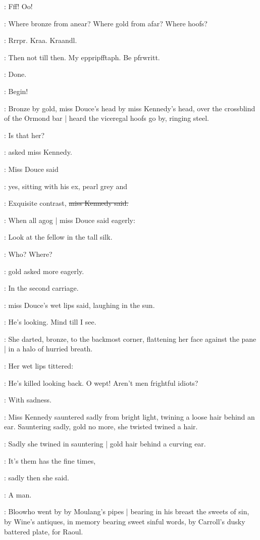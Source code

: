 :
Fff!
Oo!

\BloomInt:
Where bronze from anear?
Where gold from afar?
Where hoofs?

:
Rrrpr.
Kraa.
Kraandl.

\emmet:
Then not till then.
My eppripfftaph.
Be pfrwritt.

\BloomInt:
Done.

\BloomInt:
Begin!

\pagebreak


:
Bronze by gold,
miss Douce's head by miss Kennedy's head,
over the crossblind of the Ormond bar |
heard the viceregal hoofs go by,
ringing steel.

\MissK:
Is that her?

:
asked miss Kennedy.

:
Miss Douce said

\MissD:
yes,
sitting with his ex,
pearl grey and 

\MissK:
Exquisite contrast,
\sout{miss Kennedy said.}

:
When all agog |
miss Douce said eagerly:

\MissD:
Look at the fellow
in the tall silk.

\MissK:
Who? Where?

:
gold asked more eagerly.

\MissD:
In the second carriage.

:
miss Douce's wet lips said, laughing in the sun.

\MissD:
He's looking. Mind till I see.

:
She darted,
bronze,
to the backmost corner,
flattening her face against the pane |
in a halo of hurried breath.

:
Her wet lips tittered:

\MissD:
He's killed looking back.
\stage{[laughs]}
O wept! Aren't men frightful idiots?

:
With sadness.

:
Miss Kennedy sauntered sadly from bright light,
twining a loose hair behind an ear.
Sauntering sadly,
gold no more,
she twisted twined a hair.

:
Sadly she twined in sauntering |
gold hair behind a curving ear.

\MissK:
It's them has the fine times,

:
sadly then she said.

:
A man.

:
Bloowho went by by Moulang's pipes |
bearing in his breast the sweets of sin,
by Wine's antiques,
in memory bearing sweet sinful words,
by Carroll's dusky battered plate,
for Raoul.

